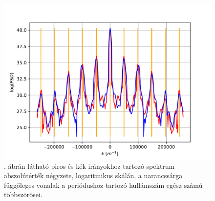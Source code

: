 \documentclass[pdftex,12pt,a4paper]{article}
\begin{document}
		\begin{figure}[H]
			\centering
			\includegraphics[scale=1]{./figs/1dpsd.pdf}
			\caption{. ábrán látható piros és kék irányokhoz tartozó spektrum abszolútérték négyzete, logaritmikus skálán, a narancssárga függőleges vonalak a periódushoz tartozó hullámszám egész számú többszörösei.}
			\label{1dpsd}
		\end{figure}
	
    
\end{document}

